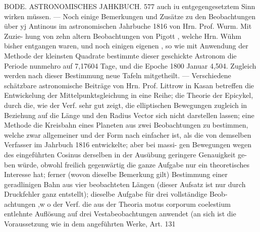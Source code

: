 \documentclass[12pt,a4paper]{article}
\begin{document}
\newpage
BODE. ASTRONOMISCHES JAHKBUCH. 577\newline
auch iu entgegengesetztem Sinn wirken müssen. --- Noch einige Bemerkungen und Zusätze zu den\newline
Beobachtungen über yj Antinous im astronomischen Jahrbuche 1816 von Hrn. Prof. Wurm. Mit Zuzie-\newline
hung von zehn altern Beobachtungen von Pigott , welche Hrn. Wühm bisher entgangen waren, und\newline
noch einigen eigenen , so wie mit Anwendung der Methode der kleinsten Quadrate bestimmte dieser\newline
geschickte Astronom die Periode nunmehro auf 7,17604 Tage, und die Epoche 1800 Januar 4,504. Zugleich\newline
werden nach dieser Bestimmung neue Tafeln mitgetheilt. --- Verschiedene schätzbare astronomische\newline
Beiträge von Hrn. Prof. Littrow in Kasan betreffen die Entwickelung der Mittelpunktsgleichung in eine\newline
Reihe; die Theorie der Epicykel, durch die, wie der Verf. sehr gut zeigt, die elliptischen Bewegungen\newline
zugleich in Beziehung auf die Länge und den Radius Vector sich nicht darstellen lassen; eine Methode\newline
die Kreisbahn eines Planeten aus zwei Beobachtungen zu bestimmen, welche zwar allgemeiner und der\newline
Form nach einfacher ist, als die von demselben Verfasser im Jahrbuch 1816 entwickelte; aber bei massi-\newline
gen Bewegungen wegen des eingeführten Cosinus derselben in der Ausübung geringere Genauigkeit ge-\newline
ben würde, obwohl freilich gegenwärtig die ganze Aufgabe nur ein theoretisches Interesse hat; ferner\newline
(wovon dieselbe Bemerkung gilt) Bestimmung einer geradlinigen Bahn aus vier beobachteten Längen\newline
(dieser Aufsatz ist nur durch Druckfehler ganz entstellt); dieselbe Aufgabe für drei vollständige Beob-\newline
achtungen ,w o der Verf. die aus der Theoria motus corporum coelestium entlehnte Auflösung auf drei\newline
Vestabeobachtungen anwendet (an sich ist die Voraussetzung wie in dem angeführten Werke, Art. 131\newline
\end{document}
